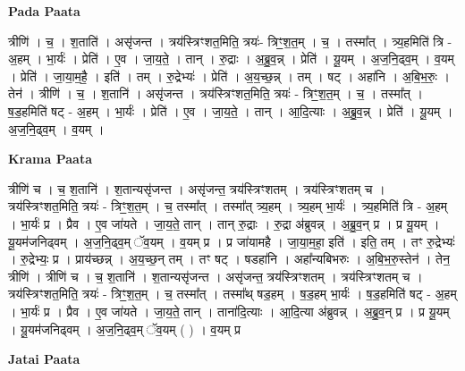 \documentclass[17pt]{extarticle}
\begin{document}
\textbf{Pada Paata} \newline

त्रीणि॑ । च॒ । श॒ताति॑ । असृ॑जन्त । त्रय॑स्त्रिꣳशत॒मिति॒ त्रयः॑- त्रिꣳ॒॒श॒त॒म् । च॒ । तस्मा᳚त् । त्र्य॒हमिति॑ त्रि - अ॒हम् । भा॒र्यः॑ । प्रेति॑ । ए॒व । जा॒य॒ते॒ । तान् । रु॒द्राः । अ॒ब्रु॒व॒न्न् । प्रेति॑ । यू॒यम् । अ॒ज॒नि॒ढ्व॒म् । व॒यम् । प्रेति॑ । जा॒या॒म॒है॒ । इति॑ । तम् । रु॒द्रेभ्यः॑ । प्रेति॑ । अ॒य॒च्छ॒न्न् । तम् । षट् । अहा॑नि । अ॒बि॒भ॒रुः॒ । तेन॑ । त्रीणि॑ । च॒ । श॒तानि॑ । असृ॑जन्त । त्रय॑स्त्रिꣳशत॒मिति॒ त्रयः॑ - त्रिꣳ॒॒श॒त॒म् । च॒ । तस्मा᳚त् । ष॒ड॒हमिति॑ षट् - अ॒हम् । भा॒र्यः॑ । प्रेति॑ । ए॒व । जा॒य॒ते॒ । तान् । आ॒दि॒त्याः । अ॒ब्रु॒व॒न्न् । प्रेति॑ । यू॒यम् । अ॒ज॒नि॒ढ्व॒म् । व॒यम् ।  \newline


\textbf{Krama Paata} \newline

त्रीणि॑ च । च॒ श॒तानि॑ । श॒तान्यसृ॑जन्त । असृ॑जन्त॒ त्रय॑स्त्रिꣳशतम् । त्रय॑स्त्रिꣳशतम् च । त्रय॑स्त्रिꣳशत॒मिति॒ त्रयः॑ - त्रिꣳ॒॒श॒त॒म् । च॒ तस्मा᳚त् । तस्मा᳚त् त्र्य॒हम् । त्र्य॒हम् भा॒र्यः॑ । त्र्य॒हमिति॑ त्रि - अ॒हम् । भा॒र्यः॑ प्र । प्रैव । ए॒व जा॑यते । जा॒य॒ते॒ तान् । तान् रु॒द्राः । रु॒द्रा अ॑ब्रुवन्न् । अ॒ब्रु॒व॒न् प्र । प्र यू॒यम् । यू॒यम॑जनिढ्वम् । अ॒ज॒नि॒ढ्व॒म् ॅव॒यम् । व॒यम् प्र । प्र जा॑यामहै । जा॒या॒म॒हा॒ इति॑ । इति॒ तम् । तꣳ रु॒द्रेभ्यः॑ । रु॒द्रेभ्यः॒ प्र । प्राय॑च्छन्न् । अ॒य॒च्छ॒न् तम् । तꣳ षट् । षडहा॑नि । अहा᳚न्यबिभरुः । अ॒बि॒भ॒रु॒स्तेन॑ । तेन॒ त्रीणि॑ । त्रीणि॑ च । च॒ श॒तानि॑ । श॒तान्यसृ॑जन्त । असृ॑जन्त॒ त्रय॑स्त्रिꣳशतम् । त्रय॑स्त्रिꣳशतम् च । त्रय॑स्त्रिꣳशत॒मिति॒ त्रयः॑ - त्रिꣳ॒॒श॒त॒म् । च॒ तस्मा᳚त् । तस्मा᳚थ् षड॒हम् । ष॒ड॒हम् भा॒र्यः॑ । ष॒ड॒हमिति॑ षट् - अ॒हम् । भा॒र्यः॑ प्र । प्रैव । ए॒व जा॑यते । जा॒य॒ते॒ तान् । ताना॑दि॒त्याः । आ॒दि॒त्या अ॑ब्रुवन्न् । अ॒ब्रु॒व॒न् प्र । प्र यू॒यम् । यू॒यम॑जनिढ्वम् । अ॒ज॒नि॒ढ्व॒म् ॅव॒यम् ( ) । 
व॒यम् प्र \newline

\textbf{Jatai Paata} \newline
\end{document}
